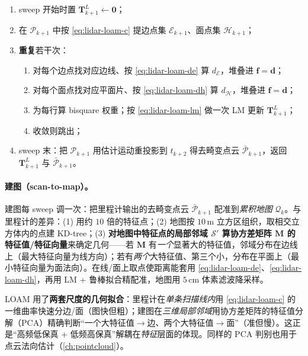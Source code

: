 \begin{algo}\label{alg:lidar-loam-odom}
\begin{enumerate}
  \item sweep 开始时置 $\mathbf{T}^L_{k+1}\leftarrow\mathbf{0}$；
  \item 在 $\mathcal{P}_{k+1}$ 中按 \cref{eq:lidar-loam-c} 提边点集 $\mathcal{E}_{k+1}$、面点集 $\mathcal{H}_{k+1}$；
  \item \textbf{重复}若干次：
  \begin{enumerate}
    \item 对每个边点找对应边线、按 \cref{eq:lidar-loam-de} 算 $d_{\mathcal{E}}$，堆叠进 $\mathbf{f}=\mathbf{d}$；
    \item 对每个面点找对应平面片、按 \cref{eq:lidar-loam-dh} 算 $d_{\mathcal{H}}$，堆叠进 $\mathbf{f}=\mathbf{d}$；
    \item 为每行算 bisquare 权重；按 \cref{eq:lidar-loam-lm} 做一次 LM 更新 $\mathbf{T}^L_{k+1}$；
    \item 收敛则跳出；
  \end{enumerate}
  \item sweep 末：把 $\mathcal{P}_{k+1}$ 用估计运动重投影到 $t_{k+2}$ 得去畸变点云 $\bar{\mathcal{P}}_{k+1}$，返回 $\mathbf{T}^L_{k+1}$ 与 $\bar{\mathcal{P}}_{k+1}$。
\end{enumerate}
\end{algo}

\paragraph{建图（scan-to-map）。}
建图每 sweep 调一次：把里程计输出的去畸变点云 $\bar{\mathcal{P}}_{k+1}$ 配准到\emph{累积地图} $\mathcal{Q}_k$\cite{zhang2014loam}。与里程计的差异：(1) 用约 $10$ 倍的特征点；(2) 地图按 $10$\,m 立方区组织，取相交立方体内的点建 KD-tree；(3) \textbf{对地图中特征点的局部邻域 $\mathcal{S}'$ 算协方差矩阵 $\mathbf{M}$ 的特征值/特征向量}来确定几何——若 $\mathbf{M}$ 有\emph{一个}显著大的特征值，邻域分布在边线上（最大特征向量为线方向）；若有\emph{两个}大特征值、第三个小，分布在平面上（最小特征向量为面法向）。在线/面上取点使距离能套用 \cref{eq:lidar-loam-de}、\cref{eq:lidar-loam-dh}，再用 LM + 鲁棒拟合精配准，地图用 $5$\,cm 体素滤波降采样。

\begin{insight}
LOAM 用了\textbf{两套尺度的几何拟合}：里程计在\emph{单条扫描线内}用 \cref{eq:lidar-loam-c} 的一维曲率快速分边/面（图快但粗）；建图在\emph{三维局部邻域}用协方差矩阵的特征值分解（PCA）精确判断“一个大特征值$\to$边、两个大特征值$\to$面”（准但慢）。这正是“高频低保真 + 低频高保真”解耦在\emph{特征}层面的体现。同样的 PCA 判别也用于点云法向估计（\cref{ch:pointcloud}）。
\end{insight}

